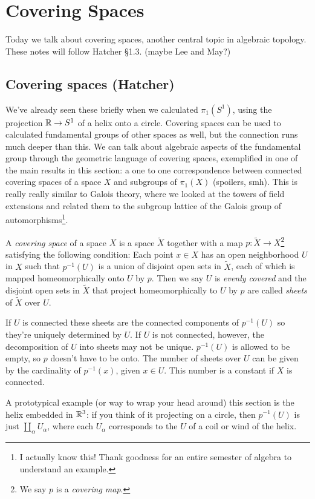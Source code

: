 \section{Covering Spaces}
Today we talk about covering spaces, another central topic in algebraic topology. These notes will follow Hatcher \S 1.3. (maybe Lee and May?)

\subsection{Covering spaces (Hatcher)}
We've already seen these briefly when we calculated $\pi_1(S^{1} )$, using the projection $\mathbb{R}\to S^{1} $ of a helix onto a circle. Covering spaces can be used to calculated fundamental groups of other spaces as well, but the connection runs much deeper than this. We can talk about algebraic aspects of the fundamental group through the geometric language of covering spaces, exemplified in one of the main results in this section: a one to one correspondence between connected covering spaces of a space $X$ and subgroups of $\pi_1(X)$ (spoilers, smh). This is really really similar to Galois theory, where we looked at the towers of field extensions and related them to the subgroup lattice of the Galois group of automorphisms\footnote{I actually know this! Thank goodness for an entire semester of algebra to understand an example.}.
\begin{definition}
    A \emph{covering space} of a space $X$ is a space $\widetilde X$ together with a map $p \colon \widetilde X \to X$\footnote{We say $p$ is a \emph{covering map}.} satisfying the following condition: Each point $x\in X$ has an open neighborhood $U$ in $X$ such that $p^{-1}(U)$ is a union of disjoint open sets in $\widetilde X$, each of which is mapped homeomorphically onto $U$ by $p$. Then we say $U$ is \emph{evenly covered} and the disjoint open sets in $\widetilde X$ that project homeomorphically to $U$ by $p$ are called \emph{sheets} of $\widetilde X$ over $U$.
\end{definition}
If $U$ is connected these sheets are the connected components of $p^{-1}(U)$ so they're uniquely determined by $U$. If $U$ is not connected, however, the decomposition of $U$ into sheets may not be unique. $p ^{-1}(U)$ is allowed to be empty, so $p$ doesn't have to be onto. The number of sheets over $U$ can be given by the cardinality of $p ^{-1}(x)$, given $x\in U$. This number is a constant if $X$ is connected.
\begin{example}
A prototypical example (or way to wrap your head around) this section is the helix embedded in $\mathbb{R}^3$: if you think of it projecting on a circle, then $p^{-1}(U)$ is just $\amalg_{\alpha }U_{\alpha }$, where each $U_{\alpha }$ corresponds to the $U$ of a coil or wind of the helix.
\end{example}
